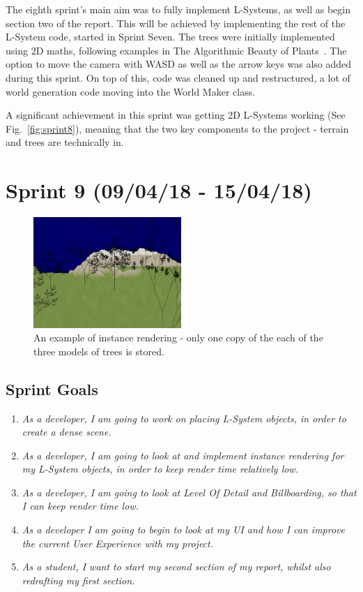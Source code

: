 \documentclass[a4paper,10pt]{report}
\begin{document}
The eighth sprint's main aim was to fully implement L-Systems, as well as begin section two of the report. This will be achieved by implementing the rest of the L-System code, started in Sprint Seven. The trees were initially implemented using 2D maths, following examples in The Algorithmic Beauty of Plants~\cite{prusinkiewicz2012algorithmic}. The option to move the camera with WASD as well as the arrow keys was also added during this sprint. On top of this, code was cleaned up and restructured, a lot of world generation code moving into the World Maker class.

A significant achievement in this sprint was getting 2D L-Systems working (See Fig.~\ref{fig:sprint8}), meaning that the two key components to the project - terrain and trees are technically in. 


\clearpage
\section{Sprint 9 (09/04/18 -  15/04/18)}

\begin{figure}[h!]
    \centering
  \includegraphics[width=0.5\textwidth]{Images/Sprint-Images/Sprint9-1.png}
 \caption{An example of instance rendering - only one copy of the each of the three models of trees is stored.}
 \label{fig:sprint9-1}
\end{figure}

\subsection{Sprint Goals}
\begin{enumerate}
    \item \textit{ As a developer, I am going to work on placing L-System objects, in order to create a dense scene.}

    \item \textit{ As a developer, I am going to look at and implement instance rendering for my L-System objects, in order to keep render time relatively low.}

    \item \textit{ As a developer, I am going to look at Level Of Detail and Billboarding, so that I can keep render time low.}

    \item \textit{ As a developer I am going to begin to look at my UI and how I can improve the current User Experience with my project.}

    \item \textit{ As a student, I want to start my second section of my report, whilst also redrafting my first section. }
\end{enumerate}
\end{document}
